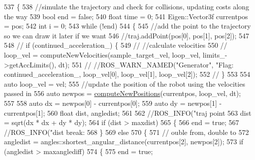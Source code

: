 \begin{DoxyCode}
537         \{
538             \textcolor{comment}{//simulate the trajectory and check for collisions, updating costs along the way}
539             \textcolor{keywordtype}{bool} end = \textcolor{keyword}{false};
540             \textcolor{keywordtype}{float} time = 0;
541             Eigen::Vector3f currentpos = pos;
542             \textcolor{keywordtype}{int} i = 0;
543             \textcolor{keywordflow}{while} (!end)
544             \{
545                 \textcolor{comment}{//add the point to the trajectory so we can draw it later if we want}
546                 \textcolor{comment}{//traj.addPoint(pos[0], pos[1], pos[2]);}
547 
548                 \textcolor{comment}{// if (continued\_acceleration\_) \{}
549                 \textcolor{comment}{//   //calculate velocities}
550                 \textcolor{comment}{//   loop\_vel = computeNewVelocities(sample\_target\_vel, loop\_vel, limits\_->getAccLimits(),
       dt);}
551                 \textcolor{comment}{//   //ROS\_WARN\_NAMED("Generator", "Flag: %
       continued\_acceleration\_, loop\_vel[0], loop\_vel[1], loop\_vel[2]);}
552                 \textcolor{comment}{// \}}
553 
554                 \textcolor{keyword}{auto} loop\_vel = vel;
555                 \textcolor{comment}{//update the position of the robot using the velocities passed in}
556                 \textcolor{keyword}{auto} newpos = \hyperlink{classcl__move__base__z_1_1backward__local__planner_1_1BackwardLocalPlanner_a0fe2ebd23fd79e8b574127e819ef0e14}{computeNewPositions}(currentpos, loop\_vel, dt);
557 
558                 \textcolor{keyword}{auto} dx = newpos[0] - currentpos[0];
559                 \textcolor{keyword}{auto} dy = newpos[1] - currentpos[1];
560                 \textcolor{keywordtype}{float} dist, angledist;
561 
562                 \textcolor{comment}{//ROS\_INFO("traj point %
563                 dist = sqrt(dx * dx + dy * dy);
564                 \textcolor{keywordflow}{if} (dist > maxdist)
565                 \{
566                     end = \textcolor{keyword}{true};
567                     \textcolor{comment}{//ROS\_INFO("dist break: %
568                 \}
569                 \textcolor{keywordflow}{else}
570                 \{
571                     \textcolor{comment}{// ouble from, double to}
572                     angledist = angles::shortest\_angular\_distance(currentpos[2], newpos[2]);
573                     \textcolor{keywordflow}{if} (angledist > maxanglediff)
574                     \{
575                         end = \textcolor{keyword}{true};
}}
\end{DoxyCode}
